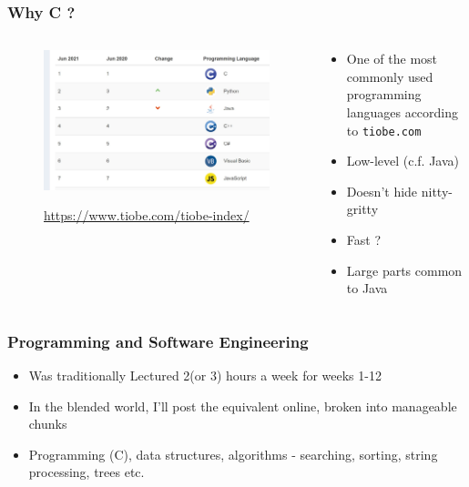 \begin{frame}%
\frametitle{Why C ?}

\begin{columns}

\begin{column}{0.60\textwidth}
\begin{figure}[h]
\centerline{
\includegraphics[width=1.0\textwidth]{../Figs/tiobe.jpg}
}
\centerline{
{\tiny \url{https://www.tiobe.com/tiobe-index/}}
}
\end{figure}
\end{column}

\begin{column}{0.35\textwidth}
\begin{itemize}[<+->]
\item One of the most commonly used programming languages
according to {\tt tiobe.com}
\item Low-level (c.f. Java)
\item Doesn't hide nitty-gritty
\item Fast ?
\item Large parts common to Java
\end{itemize}
\end{column}

\end{columns}
\end{frame}

\begin{frame}%
\frametitle{Programming and Software Engineering}
\begin{itemize}[<+->]
\item Was traditionally Lectured 2(or 3) hours a week for weeks 1-12
\item In the blended world, I'll post the equivalent online, broken
into manageable chunks
\item Programming (C), data structures, algorithms - searching, sorting, string processing, trees etc.
\end{itemize}
\end{frame}

